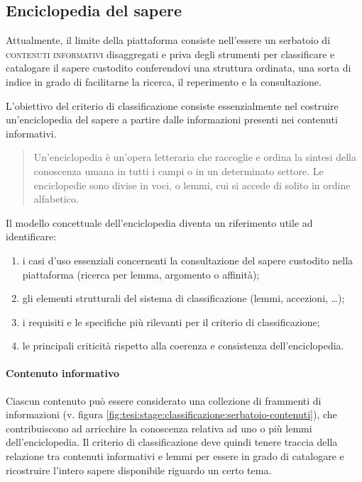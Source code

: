\subsection{Enciclopedia del sapere}
\label{sec:tesi:stage:criterio-classificazione:enciclopedia}
Attualmente, il limite della piattaforma consiste nell'essere un serbatoio di \textsc{contenuti informativi} disaggregati e priva degli strumenti per classificare e catalogare il sapere custodito conferendovi una struttura ordinata, una sorta di indice in grado di facilitarne la ricerca, il reperimento e la consultazione.

L'obiettivo del criterio di classificazione consiste essenzialmente nel costruire un'enciclopedia del sapere a partire dalle informazioni presenti nei contenuti informativi.

\begin{quotation}
Un'enciclopedia è un'opera letteraria che raccoglie e ordina la sintesi della conoscenza umana in tutti i campi o in un determinato settore. Le enciclopedie sono divise in voci, o lemmi, cui si accede di solito in ordine alfabetico. \cite{wiki:enciclopedia}
\end{quotation}

Il modello concettuale dell'enciclopedia diventa un riferimento utile ad identificare:
\begin{enumerate}
	\item i casi d'uso essenziali concernenti la consultazione del sapere custodito nella piattaforma (ricerca per lemma, argomento o affinità);
	\item gli elementi strutturali del sistema di classificazione (lemmi, accezioni, \ldots);
	\item i requisiti e le specifiche più rilevanti per il criterio di classificazione;
	\item le principali criticità rispetto alla coerenza e consistenza dell'enciclopedia.
\end{enumerate}

\paragraph{Contenuto informativo}
Ciascun contenuto può essere considerato una collezione di frammenti di informazioni (v. figura \ref{fig:tesi:stage:classificazione:serbatoio-contenuti}), che contribuiscono ad arricchire la conoscenza relativa ad uno o più lemmi dell'enciclopedia. Il criterio di classificazione deve quindi tenere traccia della relazione tra contenuti informativi e lemmi per essere in grado di catalogare e ricostruire l'intero sapere disponibile riguardo un certo tema.

